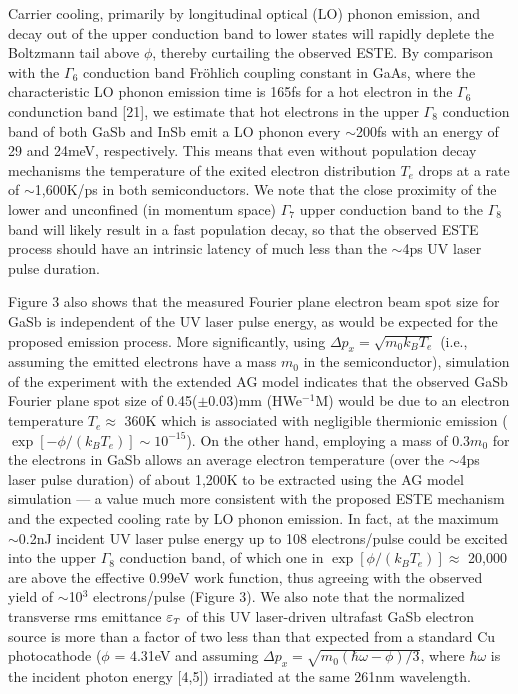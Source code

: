 Carrier cooling, primarily by longitudinal optical (LO) phonon emission, and decay out of the upper conduction band to lower states will rapidly deplete the Boltzmann tail above $\phi$, thereby curtailing the observed ESTE.
By comparison with the $\Gamma_6$ conduction band Fr\"ohlich coupling constant in GaAs, where the characteristic LO phonon emission time is 165fs for a hot electron in the $\Gamma_6$ condunction band [21], we estimate that hot electrons in the upper $\Gamma_8$ conduction band of both GaSb and InSb emit a LO phonon every $\sim$200fs with an energy of 29 and 24meV, respectively.
This means that even without population decay mechanisms the temperature of the exited electron distribution $T_e$ drops at a rate of $\sim$1,600K/ps in both semiconductors.
We note that the close proximity of the lower and unconfined (in momentum space) $\Gamma_7$ upper conduction band to the $\Gamma_8$ band will likely result in a fast population decay, so that the observed ESTE process should have an intrinsic latency of much less than the $\sim$4ps UV laser pulse duration.

Figure 3 also shows that the measured Fourier plane electron beam spot size for GaSb is independent of the UV laser pulse energy, as would be expected for the proposed emission process.
More significantly, using $\Delta p_x = \sqrt{m_0 k_B T_e}$ (i.e., assuming the emitted electrons have a mass $m_0$ in the semiconductor), simulation of the experiment with the extended AG model\cite{berger_semi-analytic_2010} indicates that the observed GaSb Fourier plane spot size of 0.45($\pm$0.03)mm (HWe$^{-1}$M) would be due to an electron temperature $T_e \approx$ 360K which is associated with negligible thermionic emission ($\exp[-\phi/(k_B T_e)] \sim 10^{-15}$).
On the other hand, employing a mass of 0.3$m_0$ for the electrons in GaSb allows an average electron temperature (over the $\sim$4ps laser pulse duration) of about 1,200K to be extracted using the AG model simulation --- a value much more consistent with the proposed ESTE mechanism and the expected cooling rate by LO phonon emission.
In fact, at the maximum $\sim$0.2nJ incident UV laser pulse energy up to 108 electrons/pulse could be excited into the upper $\Gamma_8$ conduction band, of which one in $\exp[\phi/(k_B T_e)] \approx$ 20,000 are above the effective 0.99eV work function, thus agreeing with the observed yield of $\sim$10$^3$ electrons/pulse (Figure 3).
We also note that the normalized transverse rms emittance $\varepsilon_{{\scriptscriptstyle T}}$ of this UV laser-driven ultrafast GaSb electron source is more than a factor of two less than that expected from a standard Cu photocathode ($\phi$ = 4.31eV and assuming $\Delta p_x = \sqrt{m_0 ( \hbar \omega - \phi ) / 3 }$, where $\hbar \omega$ is the incident photon energy [4,5]) irradiated at the same 261nm wavelength.


